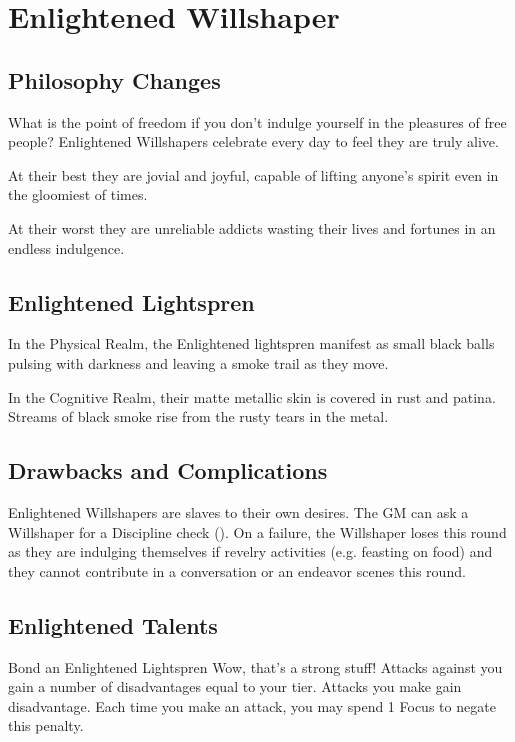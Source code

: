 \newpage
\section{Enlightened Willshaper}


\subsection{Philosophy Changes}

What is the point of freedom if you don't indulge yourself in the pleasures of free people? Enlightened Willshapers celebrate every day to feel they are truly alive.

At their best they are jovial and joyful, capable of lifting anyone's spirit even in the gloomiest of times.

At their worst they are unreliable addicts wasting their lives and fortunes in an endless indulgence.

\subsection{Enlightened Lightspren}

In the Physical Realm, the Enlightened lightspren manifest as small black balls pulsing with darkness and leaving a smoke trail as they move.

In the Cognitive Realm, their matte metallic skin is covered in rust and patina. Streams of black smoke rise from the rusty tears in the metal.

\subsection{Drawbacks and Complications}

Enlightened Willshapers are slaves to their own desires. The GM can ask a Willshaper for a Discipline check (\corruptedResistanceDC{}). On a failure, the Willshaper loses \iconAction{} this round as they are indulging themselves if revelry activities (e.g. feasting on food) and they cannot contribute in a conversation or an endeavor scenes this round.



\newpage
\subsection{Enlightened Talents}
		{Bond an Enlightened Lightspren}
		{\iconActionDouble}
		{Wow, that's a strong stuff!}
		{Attacks against you gain a number of disadvantages equal to your tier. Attacks you make gain disadvantage. Each time you make an attack, you may spend 1 Focus to negate this penalty.}
		
